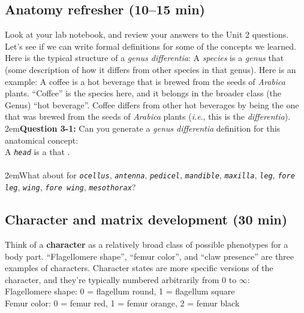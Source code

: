 \documentclass[letterpaper, 11pt]{article}
\newcommand{\latinword}[1]{\texttt{\itshape #1}}%
\begin{document}
\subsection{Anatomy refresher (10--15 min)}
Look at your lab notebook, and review your answers to the Unit 2 questions. Let's see if we can write formal  definitions for some of the concepts we learned. Here is the typical structure of a \textit{genus differentia}: A \textit{species} is a \textit{genus} that (some description of how it differs from other species in that genus). Here is an example: A coffee is a hot beverage that is brewed from the seeds of \textit{Arabica} plants. ``Coffee'' is the species here, and it belongs in the broader class (the Genus) ``hot beverage''. Coffee differs from other hot beverages by being the one that was brewed from the seeds of \textit{Arabica} plants (\textit{i.e}., this is the \textit{differentia}).\\

\hangindent2em\textbf{Question 3-1:} Can you generate a \textit{genus differentia} definition for this anatomical concept: \\

A \latinword{head} is a \makebox[30 mm]{\hrulefill} that \hrulefill.\\ \\

\hangindent2em{}What about for \latinword{ocellus}, \latinword{antenna}, \latinword{pedicel}, \latinword{mandible}, \latinword{maxilla}, \latinword{leg}, \latinword{fore leg}, \latinword{wing}, \latinword{fore wing}, \latinword{mesothorax}? \\

\subsection{Character and matrix development (30 min)}
Think of a \textbf{character} as a relatively broad class of possible phenotypes for a body part. ``Flagellomere shape'', ``femur color'', and ``claw presence'' are three examples of characters. Character states are more specific versions of the character, and they're typically numbered arbitrarily from 0 to $\infty$:\\

Flagellomere shape:	0 = flagellum round, 1 = flagellum square\\

Femur color: 0 = femur red, 1 = femur orange, 2 = femur black\\
\end{document}
